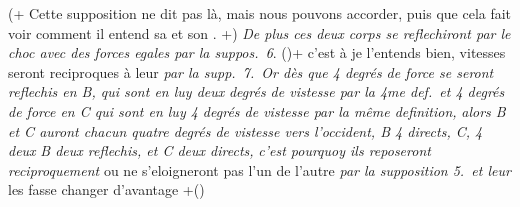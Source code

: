 %
(+ Cette supposition ne dit pas là, mais nous pouvons accorder, puis que cela fait voir comment il entend sa \protect{} et son . +) 
%
%
%
\textit{De plus ces deux corps se reflechiront par le choc\protect{} avec des forces egales\protect{} par la suppos.~6}. 
%
(\protect\vphantom)+ c'est à 
%
%
je l'entends bien,
%
%
vitesses seront reciproques à leur
%
%
\textit{par la supp.~7.\ Or dès que 4 degrés de force se seront reflechis en \textit{B}, qui sont en luy deux}
%
\textit{degrés de vistesse par la 4me def.\ et 4 degrés de force en \textit{C} qui sont en luy 4 degrés de vistesse par la même definition,}
%
\textit{alors \textit{B} et \textit{C} auront chacun quatre degrés de vistesse vers l'occident, \textit{B} 4 directs, \textit{C}, 4}
%
%
\textit{deux}
%
%
\textit{\textit{B} deux reflechis, et \textit{C} deux directs,}%
%
%
%
\textit{c'est pourquoy ils reposeront reciproquement} 
ou ne s'eloigneront pas l'un de l'autre \textit{par la supposition 5.\ et leur}
%
%
les fasse changer d'avantage +\protect\vphantom() 
